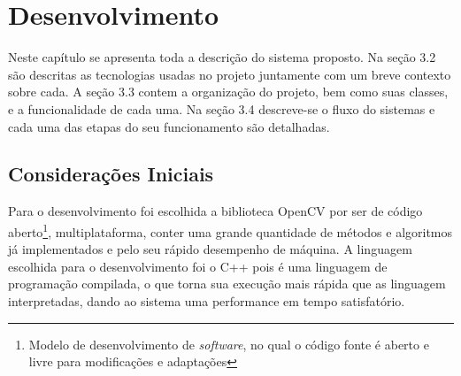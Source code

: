 	
	\chapter{Desenvolvimento} 
	Neste capítulo se apresenta toda a descrição do sistema proposto. Na seção 3.2 são descritas as tecnologias usadas no projeto juntamente com um breve contexto sobre cada. A seção 3.3 contem a organização do projeto, bem como suas classes, e a funcionalidade de cada uma. Na seção 3.4 descreve-se o fluxo do sistemas e cada uma das etapas do seu funcionamento são detalhadas.
	\section{Considerações Iniciais}
			Para o desenvolvimento foi escolhida a biblioteca OpenCV por ser de código aberto\footnote{Modelo de desenvolvimento de {\it software}, no qual o código fonte é aberto e livre para modificações e adaptações}, multiplataforma, conter uma grande quantidade de métodos e algoritmos já implementados	e pelo seu rápido desempenho de máquina.
			A linguagem escolhida para o desenvolvimento foi o C++ pois é uma linguagem de programação compilada, o que torna sua execução mais rápida que as linguagem interpretadas, dando ao sistema uma performance em tempo satisfatório. 
			
